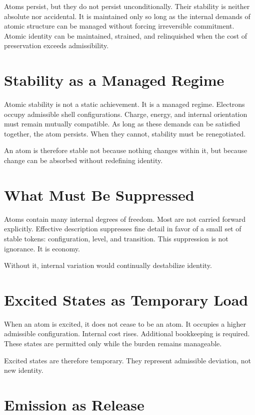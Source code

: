 \documentclass[11pt,twoside,openright]{book}
\begin{document}
Atoms persist, but they do not persist unconditionally. Their stability is neither absolute nor accidental. It is maintained only so long as the internal demands of atomic structure can be managed without forcing irreversible commitment. Atomic identity can be maintained, strained, and relinquished when the cost of preservation exceeds admissibility.

\section*{Stability as a Managed Regime}

Atomic stability is not a static achievement. It is a managed regime. Electrons occupy admissible shell configurations. Charge, energy, and internal orientation must remain mutually compatible. As long as these demands can be satisfied together, the atom persists. When they cannot, stability must be renegotiated.

An atom is therefore stable not because nothing changes within it, but because change can be absorbed without redefining identity.

\section*{What Must Be Suppressed}

Atoms contain many internal degrees of freedom. Most are not carried forward explicitly. Effective description suppresses fine detail in favor of a small set of stable tokens: configuration, level, and transition. This suppression is not ignorance. It is economy.

Without it, internal variation would continually destabilize identity.

\section*{Excited States as Temporary Load}

When an atom is excited, it does not cease to be an atom. It occupies a higher admissible configuration. Internal cost rises. Additional bookkeeping is required. These states are permitted only while the burden remains manageable.

Excited states are therefore temporary. They represent admissible deviation, not new identity.

\section*{Emission as Release}
\end{document}

